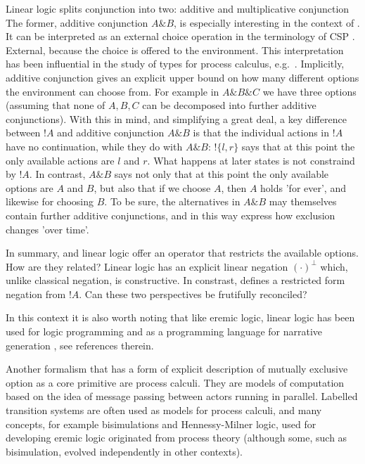 Linear logic splits conjunction into two: additive and multiplicative
conjunction The former, additive conjunction $A \& B$, is especially
interesting in the context of \ELFULL{}. It can be interpreted
\cite{AbramskyS:comintoll} as an external choice operation in the
terminology of CSP \cite{HoareC:comseq}. External, because the choice
is offered to the environment.  This interpretation has been
influential in the study of types for process calculus,
e.g.~\cite{HondaK:unitypsfsifLONG,TakeuchiK:intbaslaits,HondaK:lanpriatdfscbp}.
Implicitly, additive conjunction gives an explicit upper bound on how
many different options the environment can choose from. For example in
$A \& B \& C$ we have three options (assuming that none of $A, B, C$
can be decomposed into further additive conjunctions).  With this in
mind, and simplifying a great deal, a key difference between $!A$ and
additive conjunction $A \& B$ is that the individual actions in $!A$
have no continuation, while they do with $A \& B$: $!\{l, r\}$ says
that at this point the only available actions are $l$ and $r$. What
happens at later states is not constraind by $!A$.  In contrast, $A \&
B$ says not only that at this point the only available options are $A$
and $B$, but also that if we choose $A$, then $A$ holds 'for ever',
and likewise for choosing $B$. To be sure, the alternatives in $A \&
B$ may themselves contain further additive conjunctions, and in this
way express how exclusion changes 'over time'.

In summary, \ELABR{} and linear logic offer an operator that restricts
the available options. How are they related? Linear logic has an
explicit linear negation $(\cdot)^{\bot}$ which, unlike classical
negation, is constructive. In constrast, \ELABR{} defines a restricted
form negation from $!A$. Can these two perspectives be frutifully
reconciled?

In this context it is also worth noting that like eremic logic, linear
logic has been used for logic programming
\cite{HodasJS:logproiafoill,WinikoffMD:logprowll,PymDJ:uniprotiollp,HarlandJ:prolygao,MillerD:surlinlp}
and as a programming language for narrative generation
\cite{BosserAG:linlogpfng}, see references therein.

 Another formalism that has a form of 
explicit description of mutually exclusive option as a core primitive
are process calculi. They are models of computation based on the idea
of message passing between actors running in parallel. Labelled
transition systems are often used as models for process calculi, and
many concepts, for example bisimulations and Hennessy-Milner logic,
used for developing eremic logic originated from process theory
(although some, such as bisimulation, evolved independently in other
contexts).

